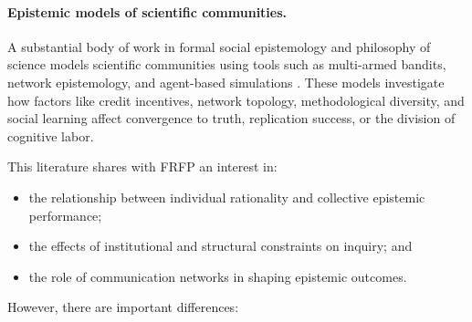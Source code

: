 \documentclass[11pt]{article}
\theoremstyle{definition}
\begin{document}
\paragraph{Epistemic models of scientific communities.}
A substantial body of work in formal social epistemology and philosophy of science models scientific communities using tools such as multi-armed bandits, network epistemology, and agent-based simulations \citep{kitcher1990division_epistemic,weisbergMuldoon2009epistemic_landscapes,zollman2007network_epistemology,zollman2010epistemic_networks,oconnor2021modelling_scientific_communities,reijulaKuorikoski2017modeling_epistemic_communities,seseljaStraesserBorg2020formal_models_scientific_inquiry,politi2021formal_models_scientific_community}. These models investigate how factors like credit incentives, network topology, methodological diversity, and social learning affect convergence to truth, replication success, or the division of cognitive labor.

This literature shares with FRFP an interest in:

\begin{itemize}
  \item the relationship between individual rationality and collective epistemic performance;
  \item the effects of institutional and structural constraints on inquiry; and
  \item the role of communication networks in shaping epistemic outcomes.
\end{itemize}

However, there are important differences:
\end{document}
